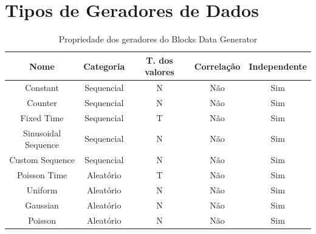 \documentclass[
	12pt,				%
	openright,			%
	twoside,			%
	a4paper,			%
	english,			%
	brazil				%
	]{abntex2}
\begin{document}
	\section{Tipos de Geradores de Dados}
		\begin{table}[h]
			\centering
			\caption{Propriedade dos geradores do Blocks Data Generator}
			\vspace{0.5cm}
			\label{table: Propriedade Geradores Blocks}
			\begin{tabular}{c|c|c|c|c}
			
				Nome                 & Categoria  & T. dos valores                                            & Correlação & Independente \\ %
				\hline %
				Constant             & Sequencial & N\footnotemark[1]                                         & Não        & Sim \\
				Counter              & Sequencial & N\footnotemark[1]                                         & Não        & Sim \\
				Fixed Time           & Sequencial & T\footnotemark[3]                                         & Não        & Sim \\
				Sinusoidal Sequence  & Sequencial & N\footnotemark[1]                                         & Não        & Sim \\
				Custom Sequence      & Sequencial & N\footnotemark[1]                                         & Não        & Sim \\
				Poisson Time         & Aleatório  & T\footnotemark[3]                                         & Não        & Sim \\
				Uniform              & Aleatório  & N\footnotemark[1]                                         & Não        & Sim \\
				Gaussian             & Aleatório  & N\footnotemark[1]                                         & Não        & Sim \\
				Poisson              & Aleatório  & N\footnotemark[1]                                         & Não        & Sim \\

\end{tabular}
\end{table}
\end{document}
